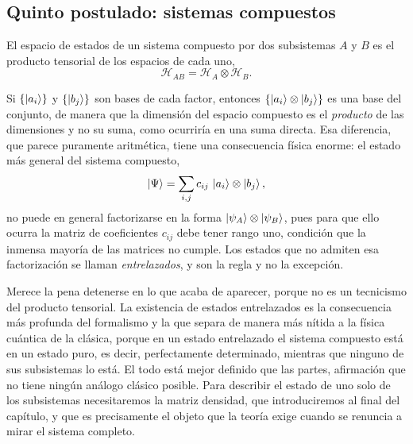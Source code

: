     \subsection{Quinto postulado: sistemas compuestos}

        \begin{Assumption}[Composición]\label{sup:Composicion}
            El espacio de estados de un sistema compuesto por dos subsistemas $A$ y $B$ es el producto tensorial de los espacios de cada uno,
            \begin{equation}\label{eq:ProductoTensorial}
                \mathcal{H}_{AB} = \mathcal{H}_{A}\otimes\mathcal{H}_{B} .
            \end{equation}
        \end{Assumption}

        Si $\{\ket{a_{i}}\}$ y $\{\ket{b_{j}}\}$ son bases de cada factor, entonces $\{\ket{a_{i}}\otimes\ket{b_{j}}\}$ es una base del conjunto, de manera que la dimensión del espacio compuesto es el \textit{producto} de las dimensiones y no su suma, como ocurriría en una suma directa. Esa diferencia, que parece puramente aritmética, tiene una consecuencia física enorme: el estado más general del sistema compuesto,
        \begin{equation}\label{eq:EstadoCompuesto}
            \ket{\Psi} = \sum_{i,j}c_{ij}\,\ket{a_{i}}\otimes\ket{b_{j}},
        \end{equation}
        no puede en general factorizarse en la forma $\ket{\psi_{A}}\otimes\ket{\psi_{B}}$, pues para que ello ocurra la matriz de coeficientes $c_{ij}$ debe tener rango uno, condición que la inmensa mayoría de las matrices no cumple. Los estados que no admiten esa factorización se llaman \textit{entrelazados}, y son la regla y no la excepción.

        Merece la pena detenerse en lo que acaba de aparecer, porque no es un tecnicismo del producto tensorial. La existencia de estados entrelazados es la consecuencia más profunda del formalismo y la que separa de manera más nítida a la física cuántica de la clásica, porque en un estado entrelazado el sistema compuesto está en un estado puro, es decir, perfectamente determinado, mientras que ninguno de sus subsistemas lo está. El todo está mejor definido que las partes, afirmación que no tiene ningún análogo clásico posible. Para describir el estado de uno solo de los subsistemas necesitaremos la matriz densidad, que introduciremos al final del capítulo, y que es precisamente el objeto que la teoría exige cuando se renuncia a mirar el sistema completo.

